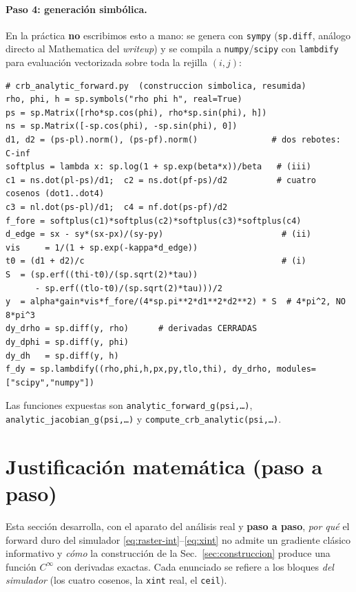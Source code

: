 \documentclass[11pt,a4paper]{article}
\theoremstyle{plain}
\theoremstyle{definition}
\begin{document}
\paragraph{Paso 4: generaci\'on simb\'olica.} En la pr\'actica \textbf{no}
escribimos esto a mano: se genera con \texttt{sympy} (\texttt{sp.diff}, an\'alogo
directo al Mathematica del \emph{writeup}) y se compila a
\texttt{numpy}/\texttt{scipy} con \texttt{lambdify} para evaluaci\'on vectorizada
sobre toda la rejilla $(i,j)$:
\begin{lstlisting}
# crb_analytic_forward.py  (construccion simbolica, resumida)
rho, phi, h = sp.symbols("rho phi h", real=True)
ps = sp.Matrix([rho*sp.cos(phi), rho*sp.sin(phi), h])
ns = sp.Matrix([-sp.cos(phi), -sp.sin(phi), 0])
d1, d2 = (ps-pl).norm(), (ps-pf).norm()               # dos rebotes: C-inf
softplus = lambda x: sp.log(1 + sp.exp(beta*x))/beta   # (iii)
c1 = ns.dot(pl-ps)/d1;  c2 = ns.dot(pf-ps)/d2          # cuatro cosenos (dot1..dot4)
c3 = nl.dot(ps-pl)/d1;  c4 = nf.dot(ps-pf)/d2
f_fore = softplus(c1)*softplus(c2)*softplus(c3)*softplus(c4)
d_edge = sx - sy*(sx-px)/(sy-py)                        # (ii)
vis     = 1/(1 + sp.exp(-kappa*d_edge))
t0 = (d1 + d2)/c                                        # (i)
S  = (sp.erf((thi-t0)/(sp.sqrt(2)*tau))
      - sp.erf((tlo-t0)/(sp.sqrt(2)*tau)))/2
y  = alpha*gain*vis*f_fore/(4*sp.pi**2*d1**2*d2**2) * S  # 4*pi^2, NO 8*pi^3
dy_drho = sp.diff(y, rho)      # derivadas CERRADAS
dy_dphi = sp.diff(y, phi)
dy_dh   = sp.diff(y, h)
f_dy = sp.lambdify((rho,phi,h,px,py,tlo,thi), dy_drho, modules=["scipy","numpy"])
\end{lstlisting}
Las funciones expuestas son \texttt{analytic\_forward\_g(psi,\dots)},
\texttt{analytic\_jacobian\_g(psi,\dots)} y \texttt{compute\_crb\_analytic(psi,\dots)}.

\section{Justificaci\'on matem\'atica (paso a paso)}
\label{sec:justificacion}

Esta secci\'on desarrolla, con el aparato del an\'alisis real y \textbf{paso a
paso}, \emph{por qu\'e} el forward duro del simulador
\eqref{eq:raster-int}--\eqref{eq:xint} no admite un gradiente cl\'asico
informativo y \emph{c\'omo} la construcci\'on de la Sec.~\ref{sec:construccion}
produce una funci\'on $C^\infty$ con derivadas exactas. Cada enunciado se refiere a
los bloques \emph{del simulador} (los cuatro cosenos, la \texttt{xint} real, el
\texttt{ceil}).
\end{document}
